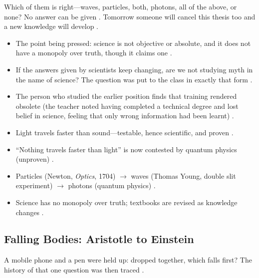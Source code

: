 Which of them is right---waves, particles, both, photons, all of the above, or none? No answer can be given . Tomorrow someone will cancel this thesis too and a new knowledge will develop .

\begin{CriticalPoint}
\begin{itemize}
    \item The point being pressed: science is not objective or absolute, and it does not have a monopoly over truth, though it claims one .
    \item If the answers given by scientists keep changing, are we not studying myth in the name of science? The question was put to the class in exactly that form .
    \item The person who studied the earlier position finds that training rendered obsolete (the teacher noted having completed a technical degree and lost belief in science, feeling that only wrong information had been learnt) .
\end{itemize}
\end{CriticalPoint}

\begin{QuickRevision}
\begin{itemize}
    \item Light travels faster than sound---testable, hence scientific, and proven .
    \item ``Nothing travels faster than light'' is now contested by quantum physics (unproven) .
    \item Particles (Newton, \textit{Optics}, 1704) $\rightarrow$ waves (Thomas Young, double slit experiment) $\rightarrow$ photons (quantum physics) .
    \item Science has no monopoly over truth; textbooks are revised as knowledge changes .
\end{itemize}
\end{QuickRevision}

\subsection{Falling Bodies: Aristotle to Einstein}
A mobile phone and a pen were held up: dropped together, which falls first?  The history of that one question was then traced .

